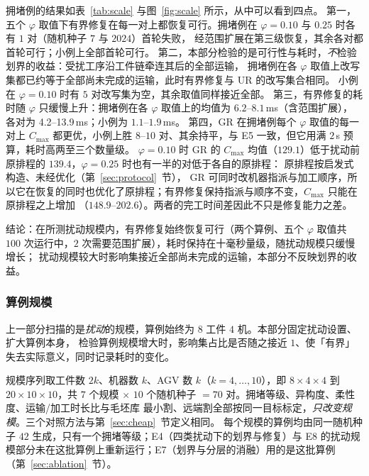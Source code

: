 \documentclass[manuscript,screen,review]{acmart}
\newcommand{\NSeeds}{10}
\newcommand{\ScaleMsMin}{4.2}       %
\newcommand{\ScaleMsMax}{13.9}      %
\newcommand{\ScaleKs}{7}
\newcommand{\ScalePairs}{70}
\newcommand{\ScaleJobsHi}{20}
\newcommand{\ScaleMachHi}{10}
\begin{document}
拥堵例的结果如表~\ref{tab:scale} 与图~\ref{fig:scale} 所示，从中可以看到四点。
第一，五个 \(\varphi\) 取值下有界修复在每一对上都恢复可行。拥堵例在 \(\varphi=0.10\) 与 \(0.25\) 时各有 \(1\) 对（随机种子 \(7\) 与 \(2024\)）首轮失败，
经范围扩展在第三级恢复，其余各对都首轮可行；小例上全部首轮可行。
第二，本部分检验的是可行性与耗时，\emph{不}检验划界的收益：受扰工序沿工件链牵连其后的全部运输，
拥堵例在各 \(\varphi\) 取值上改写集都已约等于全部尚未完成的运输，此时有界修复与 UR 的改写集合相同。
小例在 \(\varphi=0.10\) 时有 \(5\) 对改写集为空，其余取值同样接近全部。
第三，有界修复的耗时随 \(\varphi\) 只缓慢上升：拥堵例在各 \(\varphi\) 取值上的均值为 \(6.2\)--\(8.1\)\,ms（含范围扩展），
各对为 \ScaleMsMin--\ScaleMsMax\,ms；小例为 \(1.1\)--\(1.9\)\,ms。
第四，GR 在拥堵例每个 \(\varphi\) 取值的每一对上 \(C_{\max}\) 都更优，小例上胜 \(8\)--\(10\) 对、其余持平，与 E5 一致，但它用满 \(2\)\,s 预算，耗时高两至三个数量级。
\(\varphi=0.10\) 时 GR 的 \(C_{\max}\) 均值（\(129.1\)）低于扰动前原排程的 \(139.4\)，\(\varphi=0.25\) 时也有一半的对低于各自的原排程：
原排程按启发式构造、未经优化（第~\ref{sec:protocol}~节），
GR 可同时改机器指派与加工顺序，所以它在恢复的同时也优化了原排程；有界修复保持指派与顺序不变，\(C_{\max}\) 只能在原排程之上增加
（\(148.9\)--\(202.6\)）。两者的完工时间差因此不只是修复能力之差。

结论：在所测扰动规模内，有界修复始终恢复可行（两个算例、五个 \(\varphi\) 取值共 \(100\) 次运行中，\(2\) 次需要范围扩展），耗时保持在十毫秒量级，随扰动规模只缓慢增长；
扰动规模较大时影响集接近全部尚未完成的运输，本部分不反映划界的收益。

\subsubsection{算例规模}
\label{sec:instscale}

上一部分扫描的是\emph{扰动}的规模，算例始终为 \(8\) 工件 \(4\) 机。本部分固定扰动设置、扩大算例本身，
检验算例规模增大时，影响集占比是否随之接近 \(1\)、使「有界」失去实际意义，同时记录耗时的变化。

规模序列取工件数 \(2k\)、机器数 \(k\)、AGV 数 \(k\)（\(k=4,\dots,10\)），即 \(8\times4\times4\) 到
\(\ScaleJobsHi\times\ScaleMachHi\times\ScaleMachHi\)，共 \(\ScaleKs\) 个规模 \(\times\)
\(\NSeeds\) 个随机种子 \(=\ScalePairs\) 对。拥堵等级、异构度、柔性度、运输/加工时长比与毛坯库
最小割、远端割全部按同一目标标定，\emph{只改变规模}。三个对照方法与第~\ref{sec:cheap}~节定义相同。
每个规模的算例均由同一随机种子 \(42\) 生成，只有一个拥堵等级；E4（四类扰动下的划界与修复）与 E8 的扰动规模部分未在这批算例上重新运行；E7（划界与分层的消融）用的是这批算例（第~\ref{sec:ablation}~节）。
\end{document}
